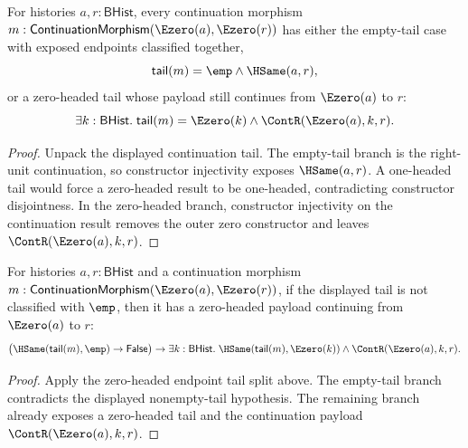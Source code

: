\begin{theorem}
\label{thm:continuation-morphism-e0-source-e0-target-tail-cases}
For histories $a,r:\mathsf{BHist}$, every continuation morphism
$m:\mathsf{ContinuationMorphism}(\Ezero(a),\Ezero(r))$ has either the
empty-tail case with exposed endpoints classified together,
$$
\mathsf{tail}(m)=\emp\land\HSame(a,r),
$$
or a zero-headed tail whose payload still continues from $\Ezero(a)$ to $r$:
$$
\exists k:\mathsf{BHist}.\;
\mathsf{tail}(m)=\Ezero(k)\land \ContR(\Ezero(a),k,r).
$$
\end{theorem}
\begin{proof}
Unpack the displayed continuation tail. The empty-tail branch is the right-unit
continuation, so constructor injectivity exposes $\HSame(a,r)$. A one-headed
tail would force a zero-headed result to be one-headed, contradicting
constructor disjointness. In the zero-headed branch, constructor injectivity
on the continuation result removes the outer zero constructor and leaves
$\ContR(\Ezero(a),k,r)$.
\end{proof}

\begin{theorem}
\label{thm:continuation-morphism-e0-source-e0-target-nonempty-tail-cases}
For histories $a,r:\mathsf{BHist}$ and a continuation morphism
$m:\mathsf{ContinuationMorphism}(\Ezero(a),\Ezero(r))$, if the displayed tail
is not classified with $\emp$, then it has a zero-headed payload continuing
from $\Ezero(a)$ to $r$:
$$
\bigl(\HSame(\mathsf{tail}(m),\emp)\to\mathsf{False}\bigr)
\to
\exists k:\mathsf{BHist}.\;
\HSame(\mathsf{tail}(m),\Ezero(k))\land \ContR(\Ezero(a),k,r).
$$
\end{theorem}
\begin{proof}
Apply the zero-headed endpoint tail split above. The empty-tail branch
contradicts the displayed nonempty-tail hypothesis. The remaining branch
already exposes a zero-headed tail and the continuation payload
$\ContR(\Ezero(a),k,r)$.
\end{proof}

